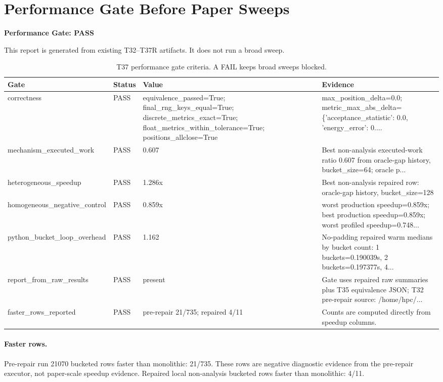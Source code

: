\section*{Performance Gate Before Paper Sweeps}
\textbf{Performance Gate: PASS}

This report is generated from existing T32--T37R artifacts. It does not run a broad sweep.

\begin{table}[htbp]
\centering
\caption{T37 performance gate criteria. A FAIL keeps broad sweeps blocked.}
\begin{tabular}{llll}
\hline
Gate & Status & Value & Evidence \\
\hline
correctness & PASS & equivalence\_passed=True; final\_rng\_keys\_equal=True; discrete\_metrics\_exact=True; float\_metrics\_within\_tolerance=True; positions\_allclose=True & max\_position\_delta=0.0; metric\_max\_abs\_delta=\{'acceptance\_statistic': 0.0, 'energy\_error': 0.... \\
mechanism\_executed\_work & PASS & 0.607 & Best non-analysis executed-work ratio 0.607 from oracle-gap history, bucket\_size=64; oracle p... \\
heterogeneous\_speedup & PASS & 1.286x & Best non-analysis repaired row: oracle-gap history, bucket\_size=128 \\
homogeneous\_negative\_control & PASS & 0.859x & worst production speedup=0.859x; best production speedup=0.859x; worst profiled speedup=0.748... \\
python\_bucket\_loop\_overhead & PASS & 1.162 & No-padding repaired warm medians by bucket count: 1 buckets=0.190039s, 2 buckets=0.197377s, 4... \\
report\_from\_raw\_results & PASS & present & Gate uses repaired raw summaries plus T35 equivalence JSON; T32 pre-repair source: /home/hpc/... \\
faster\_rows\_reported & PASS & pre-repair 21/735; repaired 4/11 & Counts are computed directly from speedup columns. \\
\hline
\end{tabular}
\end{table}

\paragraph{Faster rows.}
Pre-repair run 21070 bucketed rows faster than monolithic: 21/735. These rows are negative diagnostic evidence from the pre-repair executor, not paper-scale speedup evidence.
Repaired local non-analysis bucketed rows faster than monolithic: 4/11.

